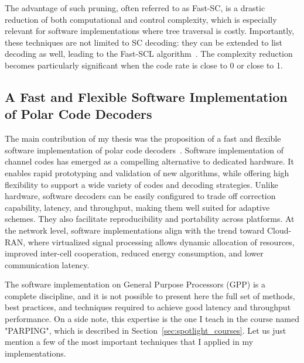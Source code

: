 \documentclass[11pt]{report}
\begin{document}
The advantage of such pruning, often referred to as Fast-SC, is a drastic reduction of both computational and control complexity, which is especially relevant for software implementations where tree traversal is costly. Importantly, these techniques are not limited to SC decoding: they can be extended to list decoding as well, leading to the Fast-SCL algorithm~\cite{Sarkis2016}. The complexity reduction becomes particularly significant when the code rate is close to 0 or close to 1.


\subsection{A Fast and Flexible Software Implementation of Polar Code Decoders}
\label{sec:fast_flexible_polar_decoders}

The main contribution of my thesis was the proposition of a fast and flexible software implementation of polar code decoders~\cite{leonardon:hal-01987848}. Software implementation of channel codes has emerged as a compelling alternative to dedicated hardware. It enables rapid prototyping and validation of new algorithms, while offering high flexibility to support a wide variety of codes and decoding strategies. Unlike hardware, software decoders can be easily configured to trade off correction capability, latency, and throughput, making them well suited for adaptive schemes. They also facilitate reproducibility and portability across platforms. At the network level, software implementations align with the trend toward Cloud-RAN, where virtualized signal processing allows dynamic allocation of resources, improved inter-cell cooperation, reduced energy consumption, and lower communication latency.

The software implementation on General Purpose Processors (GPP) is a complete discipline, and it is not possible to present here the full set of methods, best practices, and techniques required to achieve good latency and throughput performance. On a side note, this expertise is the one I teach in the course named "PARPING", which is described in Section~\ref{sec:spotlight_courses}. Let us just mention a few of the most important techniques that I applied in my implementations.
\end{document}
